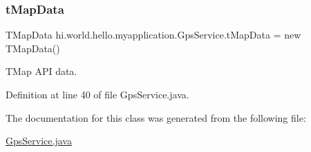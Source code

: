 \subsubsection{\texorpdfstring{tMapData}{tMapData}}
{\footnotesize\ttfamily T\+Map\+Data hi.\+world.\+hello.\+myapplication.\+Gps\+Service.\+t\+Map\+Data = new T\+Map\+Data()\hspace{0.3cm}{\ttfamily [private]}}



T\+Map A\+PI data. 



Definition at line 40 of file Gps\+Service.\+java.



The documentation for this class was generated from the following file\+:\begin{DoxyCompactItemize}
\item 
\mbox{\hyperlink{_gps_service_8java}{Gps\+Service.\+java}}\end{DoxyCompactItemize}
